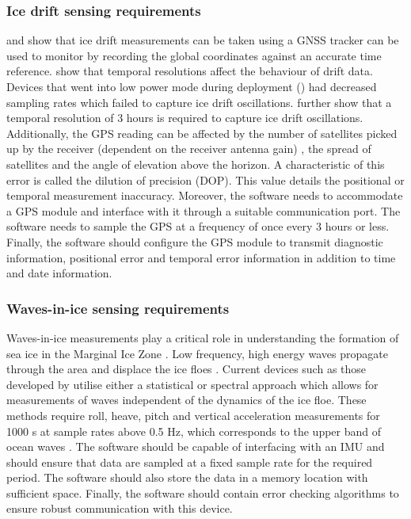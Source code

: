 \subsubsection{Ice drift sensing requirements}

\textcite{trident,uptempo,kohout2015device} and \textcite{albarello2020drift} show that ice drift measurements can be taken using a GNSS tracker can be used to monitor by recording the global coordinates against an accurate time reference. \textcite{alberello2019drift} show that temporal resolutions affect the behaviour of drift data. Devices that went into low power mode during deployment (\cite{vichi2019effects,alberello2019drift}) had decreased sampling rates which failed to capture ice drift oscillations. \textcite{albarello2020drift} further show that a temporal resolution of 3 hours is required to capture ice drift oscillations. Additionally, the GPS reading can be affected by the number of satellites picked up by the receiver (dependent on the receiver antenna gain) \cite{spilker1996global}, the spread of satellites and the angle of elevation above the horizon. A characteristic of this error is called the dilution of precision (DOP). This value details the positional or temporal measurement inaccuracy. Moreover, the software needs to accommodate a GPS module and interface with it through a suitable communication port. The software needs to sample the GPS at a frequency of once every 3 hours or less. Finally, the software should configure the GPS module to transmit diagnostic information, positional error and temporal error information in addition to time and date information.\par 

\subsubsection{Waves-in-ice sensing requirements}

Waves-in-ice measurements play a critical role in understanding the formation of sea ice in the Marginal Ice Zone \cite{alberello2019drift}. Low frequency, high energy waves propagate through the area and displace the ice floes \cite{womack_2020}. Current devices such as those developed by \textcite{rabault2017measurements,thomson2012wave,kohout2015device} utilise either a statistical \cite{kuik1988method} or spectral \cite{earle1996nondirectional,welch1967use} approach which allows for measurements of waves independent of the dynamics of the ice floe. These methods require roll, heave, pitch and vertical acceleration measurements for 1000 s at sample rates above 0.5 Hz, which corresponds to the upper band of ocean waves \cite{earle1996nondirectional}. The software should be capable of interfacing with an IMU and should ensure that data are sampled at a fixed sample rate for the required period. The software should also store the data in a memory location with sufficient space. Finally, the software should contain error checking algorithms to ensure robust communication with this device. \par 

